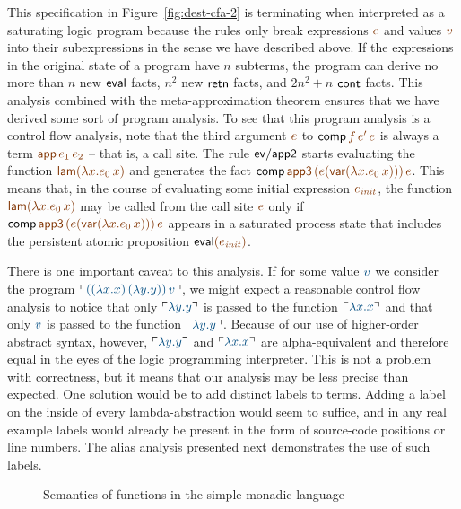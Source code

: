 This specification in Figure~\ref{fig:dest-cfa-2} is terminating when
interpreted as a saturating logic program because the rules only break
expressions $\lf{e}$ and values $\lf{v}$ 
into their subexpressions in the sense
we have described above. If the expressions in the original state of a
program have $n$ subterms, the program can derive no more than $n$ new
${\sf eval}$ facts, $n^2$ new ${\sf retn}$ facts, and $2n^2 + n$ ${\sf
  cont}$ facts. This analysis combined with the meta-approximation
theorem ensures that we have derived some sort of program analysis. To
see that this program analysis is a control flow analysis, note that
the third argument $\lf{e}$ to ${\sf comp}\,\lf{f}\,\lf{e'}\,\lf{e}$ 
is always a term
$\lf{{\sf app}\,e_1\,e_2}$ -- that is, a call site. The rule ${\sf
  ev/app2}$ starts evaluating the function $\lf{{\sf lam}(\lambda
x.e_0\,x)}$ and generates the fact ${\sf comp}\,\lf{\sf app3}\,\lf{(e({\sf
  var}(\lambda x.e_0\,x)))}\,\lf{e}$. This means that, in the course of
evaluating some initial expression $\lf{e_{\it init}}$, the function $\lf{{\sf
  lam}(\lambda x.e_0\,x)}$ may be called from the call site $\lf{e}$ only if
${\sf comp}\,\lf{\sf app3}\,\lf{(e({\sf var}(\lambda x.e_0\,x)))}\,\lf{e}$ appears
in a saturated process state that includes the persistent 
atomic proposition ${\sf eval}\lf{(e_{\it init})}$.

There is one important caveat to this analysis. If for some value $\obj{v}$
we consider the program $\interp{((\lambda x.x)\,(\lambda y.y))\,v}$,
we might expect a reasonable control flow analysis to notice that only
$\interp{\lambda y.y}$ is passed to the function $\interp{\lambda
  x.x}$ and that only $\obj{v}$ is passed to the function $\interp{\lambda
  y.y}$. Because of our use of higher-order abstract syntax, however,
$\interp{\lambda y.y}$ and $\interp{\lambda x.x}$ are alpha-equivalent
and therefore equal in the eyes of the logic programming
interpreter. This is not a problem with correctness, but it means that
our analysis may be less precise than expected. One solution would be
to add distinct labels to terms. Adding a label on the inside of every
lambda-abstraction would seem to suffice, and in any real example
labels would already be present in the form of source-code positions
or line numbers. The alias analysis presented next demonstrates the
use of such labels.

\begin{figure}
\caption{Semantics of functions in the simple monadic language}
\label{fig:ssos-monadic}
\end{figure}

